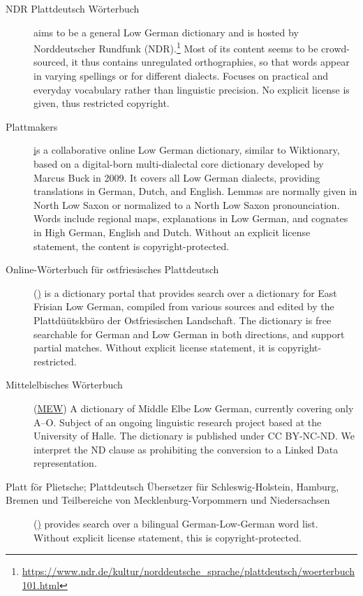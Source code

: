 \documentclass{article}
\begin{document}
\begin{description}
\item[NDR Plattdeutsch Wörterbuch] aims to be a general Low German dictionary and is hosted by Norddeutscher Rundfunk (NDR).\footnote{\url{https://www.ndr.de/kultur/norddeutsche_sprache/plattdeutsch/woerterbuch101.html}} Most of its content seems to be crowd-sourced, it thus contains unregulated orthographies, so that words appear in varying spellings or for different dialects. Focuses on practical and everyday vocabulary rather than linguistic precision. No explicit license is given, thus restricted copyright.

\item[Plattmakers] \href{https://plattmakers.de} is a collaborative online Low German dictionary, similar to Wiktionary, based on a digital-born multi-dialectal core dictionary developed by Marcus Buck in 2009. It covers all Low German dialects, providing translations in German, Dutch, and English. Lemmas are normally given in North Low Saxon or normalized to a North Low Saxon pronounciation. Words include regional maps, explanations in Low German, and cognates in High German, English and Dutch. Without an explicit license statement, the content is copyright-protected.

\item[Online-Wörterbuch für ostfriesisches Plattdeutsch] (\href{https://www.platt-wb.de/}) 
    is a dictionary portal that provides search over a dictionary for East Frisian Low German, compiled from various sources and edited by the Plattdüütskbüro der Ostfriesischen Landschaft. The dictionary is free searchable for German and Low German in both directions, and support partial matches. Without explicit license statement, it is copyright-restricted.

\item[Mittelelbisches Wörterbuch] (\href{https://mew.uzi.uni-halle.de/artikel/25748}{MEW})
    A dictionary of Middle Elbe Low German, currently covering only A–O. Subject of an ongoing linguistic research project based at the University of Halle.  The dictionary is published under CC BY-NC-ND. We interpret the ND clause as prohibiting the conversion to a Linked Data representation.

\item[Platt för Plietsche; Plattdeutsch Übersetzer für Schleswig-Holstein, Hamburg, Bremen und Teilbereiche von Mecklenburg-Vorpommern und Niedersachsen] (\href{https://www.plattdeutsches-woerterbuch.de/}) provides search over a bilingual German-Low-German word list. Without explicit license statement, this is copyright-protected.



\end{description}
\end{document}
